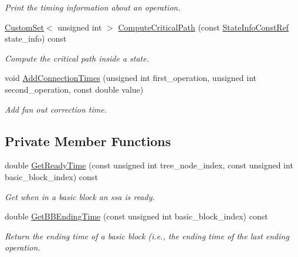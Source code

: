 \begin{DoxyCompactItemize}
\begin{DoxyCompactList}\small\item\em Print the timing information about an operation. \end{DoxyCompactList}\item 
\hyperlink{custom__set_8hpp_a615bc2f42fc38a4bb1790d12c759e86f}{Custom\+Set}$<$ unsigned int $>$ \hyperlink{classSchedule_a7ab094843958d44cf31dc83a3e0b1ec7}{Compute\+Critical\+Path} (const \hyperlink{state__transition__graph_8hpp_a50240fded93adab729e333c2b8090a8b}{State\+Info\+Const\+Ref} state\+\_\+info) const
\begin{DoxyCompactList}\small\item\em Compute the critical path inside a state. \end{DoxyCompactList}\item 
void \hyperlink{classSchedule_aae7b5c12a1beb8b9d2c8986b06a705c2}{Add\+Connection\+Times} (unsigned int first\+\_\+operation, unsigned int second\+\_\+operation, const double value)
\begin{DoxyCompactList}\small\item\em Add fan out correction time. \end{DoxyCompactList}\end{DoxyCompactItemize}
\subsection*{Private Member Functions}
\begin{DoxyCompactItemize}
\item 
double \hyperlink{classSchedule_a8d72a4f687d2af4a664f711c7c192c0e}{Get\+Ready\+Time} (const unsigned int tree\+\_\+node\+\_\+index, const unsigned int basic\+\_\+block\+\_\+index) const
\begin{DoxyCompactList}\small\item\em Get when in a basic block an ssa is ready. \end{DoxyCompactList}\item 
double \hyperlink{classSchedule_a22d0a54d38e05ab87f86b5c898908816}{Get\+B\+B\+Ending\+Time} (const unsigned int basic\+\_\+block\+\_\+index) const
\begin{DoxyCompactList}\small\item\em Return the ending time of a basic block (i.\+e., the ending time of the last ending operation. \end{DoxyCompactList}\end{DoxyCompactItemize}
